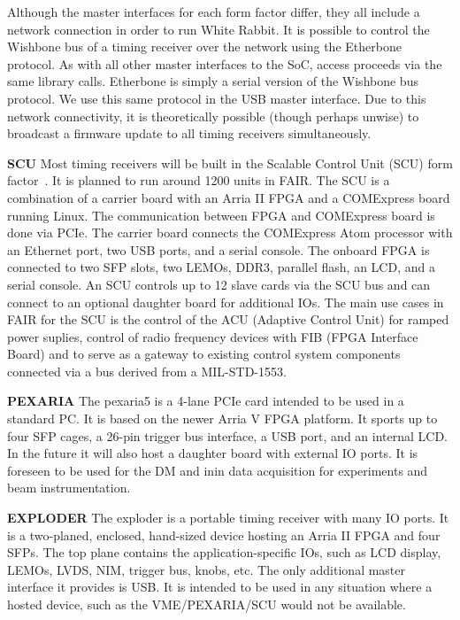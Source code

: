 \documentclass{JAC2003}
\begin{document}
Although the master interfaces for each form factor differ,
they all include a network connection in order to run White Rabbit.
It is possible to control the Wishbone bus of a timing receiver over
the network using the Etherbone protocol.
As with all other master interfaces to the SoC,
access proceeds via the same library calls.
Etherbone is simply a serial version of the Wishbone bus protocol.
We use this same protocol in the USB master interface.
Due to this network connectivity,
it is theoretically possible (though perhaps unwise)
to broadcast a firmware update to all timing receivers simultaneously.

\textbf{SCU}
Most timing receivers will be built in the 
Scalable Control Unit (SCU) form factor~\cite{scu}.
It is planned to run around 1200 units in FAIR.
The SCU is a combination of a carrier board with an Arria II FPGA and a
COMExpress board running Linux.
The communication between FPGA and COMExpress board is done via PCIe.
The carrier board connects the COMExpress Atom processor with
an Ethernet port, two USB ports, and a serial console.
The onboard FPGA is connected to two SFP slots, two LEMOs, DDR3, 
parallel flash, an LCD, and a serial console.
An SCU controls up to 12 slave cards via the SCU bus
and can connect to an optional daughter board for additional IOs.
The main use cases in FAIR for the SCU is the control of the ACU
(Adaptive Control Unit) for ramped power suplies,
control of radio frequency devices with FIB (FPGA Interface Board) and
to serve as a gateway to existing control system components connected via a 
bus derived from a MIL-STD-1553.

\textbf{PEXARIA}
The pexaria5 is a 4-lane PCIe card intended to be used in a standard PC.
It is based on the newer Arria V FPGA platform.
It sports up to four SFP cages, a 26-pin trigger bus interface,
a USB port, and an internal LCD.
In the future it will also host a daughter board with external IO
ports.
It is foreseen to be used for the DM and inin data acquisition for experiments
and beam instrumentation.

\textbf{EXPLODER}
The exploder is a portable timing receiver with many IO ports.
It is a two-planed, enclosed, hand-sized device 
hosting an Arria II FPGA and four SFPs.
The top plane contains the application-specific IOs,
such as LCD display, LEMOs, LVDS, NIM, trigger bus, knobs, etc.
The only additional master interface it provides is USB.
It is intended to be used in any situation where a hosted device,
such as the VME/PEXARIA/SCU would not be available.
\end{document}
